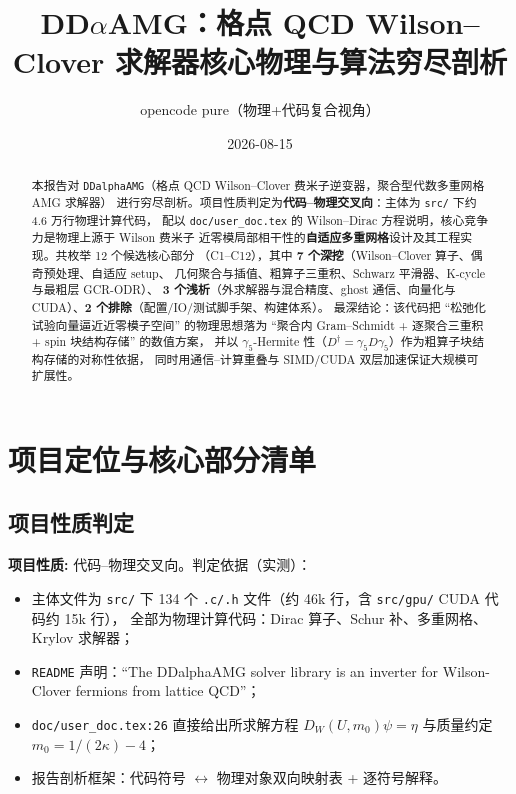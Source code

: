 \documentclass[UTF8]{ctexart}
\title{DD$\alpha$AMG：格点 QCD Wilson--Clover 求解器核心物理与算法穷尽剖析}
\author{opencode pure（物理+代码复合视角）}
\date{2026-08-15}
\begin{document}
\maketitle

\begin{abstract}
本报告对 \texttt{DDalphaAMG}（格点 QCD Wilson--Clover 费米子逆变器，聚合型代数多重网格 AMG 求解器）
进行穷尽剖析。项目性质判定为\textbf{代码--物理交叉向}：主体为 \texttt{src/} 下约 4.6 万行物理计算代码，
配以 \texttt{doc/user\_doc.tex} 的 Wilson--Dirac 方程说明，核心竞争力是物理上源于 Wilson 费米子
近零模局部相干性的\textbf{自适应多重网格}设计及其工程实现。共枚举 12 个候选核心部分
（C1--C12），其中 \textbf{7 个深挖}（Wilson--Clover 算子、偶奇预处理、自适应 setup、
几何聚合与插值、粗算子三重积、Schwarz 平滑器、K-cycle 与最粗层 GCR-ODR）、
\textbf{3 个浅析}（外求解器与混合精度、ghost 通信、向量化与 CUDA）、\textbf{2 个排除}（配置/IO/测试脚手架、构建体系）。
最深结论：该代码把 ``松弛化试验向量逼近近零模子空间'' 的物理思想落为
``聚合内 Gram--Schmidt + 逐聚合三重积 + spin 块结构存储'' 的数值方案，
并以 $\gamma_5$-Hermite 性（$D^\dagger=\gamma_5 D \gamma_5$）作为粗算子块结构存储的对称性依据，
同时用通信--计算重叠与 SIMD/CUDA 双层加速保证大规模可扩展性。
\end{abstract}

\tableofcontents

\section{项目定位与核心部分清单}

\subsection{项目性质判定}
\begin{keybox}
\textbf{项目性质:} \textcolor{phys}{代码--物理交叉向}。判定依据（实测）：
\begin{itemize}
\item 主体文件为 \texttt{src/} 下 134 个 \texttt{.c/.h} 文件（约 46k 行，含 \texttt{src/gpu/} CUDA 代码约 15k 行），
全部为物理计算代码：Dirac 算子、Schur 补、多重网格、Krylov 求解器；
\item \texttt{README} 声明：``The DDalphaAMG solver library is an inverter for Wilson-Clover fermions from lattice QCD''；
\item \texttt{doc/user\_doc.tex:26} 直接给出所求解方程 $D_W(U,m_0)\psi=\eta$ 与质量约定 $m_0=1/(2\kappa)-4$；
\item 报告剖析框架：\textcolor{map}{代码符号 $\leftrightarrow$ 物理对象双向映射表} + 逐符号解释。
\end{itemize}
\end{keybox}
\end{document}
